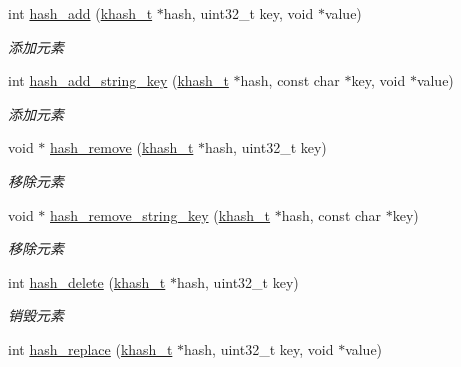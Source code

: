 \begin{DoxyCompactItemize}
int \hyperlink{a00067_aff2221d277f95457bc2fdf4215bd196e_aff2221d277f95457bc2fdf4215bd196e}{hash\+\_\+add} (\hyperlink{a00056_aa242a9a673d8677076543d5768798f2c_aa242a9a673d8677076543d5768798f2c}{khash\+\_\+t} $\ast$hash, uint32\+\_\+t key, void $\ast$value)
\begin{DoxyCompactList}\small\item\em 添加元素 \end{DoxyCompactList}\item 
int \hyperlink{a00067_a9fd87e76680bcfb665a95535746c166d_a9fd87e76680bcfb665a95535746c166d}{hash\+\_\+add\+\_\+string\+\_\+key} (\hyperlink{a00056_aa242a9a673d8677076543d5768798f2c_aa242a9a673d8677076543d5768798f2c}{khash\+\_\+t} $\ast$hash, const char $\ast$key, void $\ast$value)
\begin{DoxyCompactList}\small\item\em 添加元素 \end{DoxyCompactList}\item 
void $\ast$ \hyperlink{a00067_a544058a99adc9150c308b0bf4a98cf07_a544058a99adc9150c308b0bf4a98cf07}{hash\+\_\+remove} (\hyperlink{a00056_aa242a9a673d8677076543d5768798f2c_aa242a9a673d8677076543d5768798f2c}{khash\+\_\+t} $\ast$hash, uint32\+\_\+t key)
\begin{DoxyCompactList}\small\item\em 移除元素 \end{DoxyCompactList}\item 
void $\ast$ \hyperlink{a00067_a319fdee63a99809c36438ea7200b0785_a319fdee63a99809c36438ea7200b0785}{hash\+\_\+remove\+\_\+string\+\_\+key} (\hyperlink{a00056_aa242a9a673d8677076543d5768798f2c_aa242a9a673d8677076543d5768798f2c}{khash\+\_\+t} $\ast$hash, const char $\ast$key)
\begin{DoxyCompactList}\small\item\em 移除元素 \end{DoxyCompactList}\item 
int \hyperlink{a00067_ad8391c6d9c70f03fde25994da030b0c5_ad8391c6d9c70f03fde25994da030b0c5}{hash\+\_\+delete} (\hyperlink{a00056_aa242a9a673d8677076543d5768798f2c_aa242a9a673d8677076543d5768798f2c}{khash\+\_\+t} $\ast$hash, uint32\+\_\+t key)
\begin{DoxyCompactList}\small\item\em 销毁元素 \end{DoxyCompactList}\item 
int \hyperlink{a00067_aa82d295b5298fc0f2e46d583ee83731b_aa82d295b5298fc0f2e46d583ee83731b}{hash\+\_\+replace} (\hyperlink{a00056_aa242a9a673d8677076543d5768798f2c_aa242a9a673d8677076543d5768798f2c}{khash\+\_\+t} $\ast$hash, uint32\+\_\+t key, void $\ast$value)

\end{DoxyCompactItemize}
